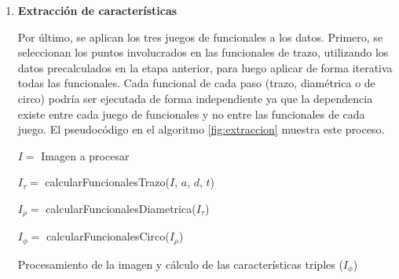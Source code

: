 \begin{enumerate}
    
    \item  \textbf{Extracción de características}
    
    Por último, se aplican los tres juegos de funcionales a los datos. Primero, se seleccionan los puntos involucrados en las funcionales de trazo, utilizando los datos precalculados en la etapa anterior, para luego aplicar de forma iterativa todas las funcionales.
    Cada funcional de cada paso (trazo, diamétrica o de circo) podría ser ejecutada de forma independiente ya que la dependencia existe entre cada juego de funcionales y no entre las funcionales de cada juego. El pseudocódigo en el algoritmo \ref{fig:extraccion} muestra este proceso.\\
    
    \begin{algorithm}[h]
        \begin{algorithmic}
            \State $I =$ Imagen a procesar
            
            
                    
                        \State $I_{\tau} = $ calcularFuncionalesTrazo($I$, $a$, $d$, $t$)
                    \EndFor
                \EndFor
    
                    \State $I_{\rho} = $ calcularFuncionalesDiametrica($I_{\tau}$)
                \EndFor
            
            \EndFor
            
                \State $I_{\phi} = $ calcularFuncionalesCirco($I_{\rho}$)
    
            \EndFor
        \end{algorithmic}
        \caption{Procesamiento de la imagen y cálculo de las características triples ($I_{\phi}$)}
        \label{fig:extraccion}
    \end{algorithm}


\end{enumerate}
